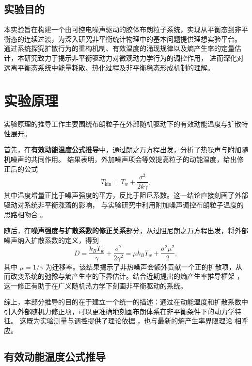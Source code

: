 \documentclass[a4paper]{report} %
\begin{document}
\section{实验目的}
本实验旨在构建一个由可控电噪声驱动的胶体布朗粒子系统，实现从平衡态到非平衡态的连续过渡，为深入研究非平衡统计物理中的基本问题提供理想实验平台。
通过系统探究扩散行为的重构机制、有效温度的涌现规律以及熵产生率的定量估计，本研究致力于揭示非平衡驱动力对微观动力学行为的调控作用，
进而深化对远离平衡态系统中能量耗散、热化过程及非平衡稳态形成机制的理解。

\chapter{实验原理}
实验原理的推导工作主要围绕布朗粒子在外部随机驱动下的有效动能温度与扩散特性展开。\par
首先，在\textbf{有效动能温度公式推导}中，通过朗之万方程出发，分析了热噪声与附加随机噪声的共同作用。
结果表明，外加噪声项会等效提高粒子的动能温度，给出修正后的公式
\[
T_{\text{kin}} = T_w + \frac{\sigma^2}{2k\gamma},
\]
其中温度增量正比于噪声强度的平方，反比于阻尼系数。这一结论直接刻画了外部驱动对系统非平衡涨落的影响，
与实验研究中利用附加噪声调控布朗粒子温度的思路相吻合 \cite{Martinez2013,Roldan2014}。\par
随后，在\textbf{噪声强度与扩散系数的修正关系}部分，从过阻尼朗之万方程出发，将外部噪声纳入扩散系数的定义，得到
\[
D = \frac{k_B T_w}{\gamma} + \frac{\sigma^2}{2\gamma^2} = \mu k_B T_w + \frac{\sigma^2 \mu^2}{2},
\]
其中 $\mu = 1/\gamma$ 为迁移率。该结果揭示了非热噪声会额外贡献一个正的扩散项，从而改变系统的弛豫与熵产生率的下界估计。结合近期提出的熵产生率推导框架 \cite{Leighton2024}，
这一修正有助于在广义随机热力学下刻画非平衡驱动的系统。\par
综上，本部分推导的目的在于建立一个统一的描述：通过在动能温度和扩散系数中引入外部随机力修正项，可以更准确地刻画布朗体系在非平衡条件下的动力学特征。
这既为实验测量与调控提供了理论依据 \cite{Martinez2013,Roldan2014}，也与最新的熵产生率界限理论 \cite{Leighton2024} 相呼应。

\section{有效动能温度公式推导}
\end{document}
